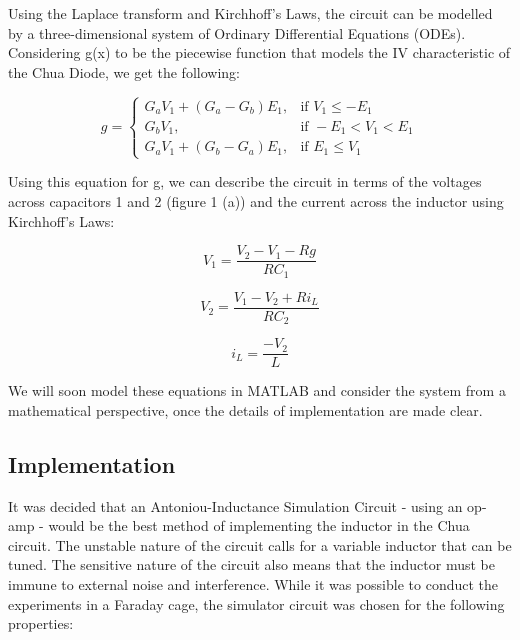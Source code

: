 \documentclass[jou,apacite]{apa6}
\begin{document}
Using the Laplace transform and Kirchhoff's Laws, the circuit can be modelled by a three-dimensional system of Ordinary Differential Equations (ODEs). Considering g(x) to be the piecewise function that models the IV characteristic of the Chua Diode, we get the following:

\begin{equation}
 g = 
 \begin{cases}
  G_a V_1 + (G_a - G_b) E_1 , & \text{if } V_1 \leqslant -E_1 \\
  G_b V_1 , & \text{if } -E_1 < V_1 < E_1 \\
  G_a V_1 + (G_b - G_a) E_1 , & \text{if } E_1 \leqslant V_1
 \end{cases}
\end{equation}

Using this equation for g, we can describe the circuit in terms of the voltages across capacitors 1 and 2 (figure 1 (a)) and the current across the inductor using Kirchhoff's Laws:

\begin{equation}
V_1 = \frac{V_2 - V_1 - Rg}{RC_1} 
\end{equation}

\begin{equation}
V_2 = \frac{V_1 - V_2 + Ri_L}{RC_2}
\end{equation}

\begin{equation}
i_L = \frac{-V_2}{L}
\end{equation}

We will soon model these equations in MATLAB and consider the system from a mathematical perspective, once the details of implementation are made clear.

\subsection{Implementation}

It was decided that an Antoniou-Inductance Simulation Circuit - using an op-amp - would be the best method of implementing the inductor in the Chua circuit. The unstable nature of the circuit calls for a variable inductor that can be tuned. The sensitive nature of the circuit also means that the inductor must be immune to external noise and interference. While it was possible to conduct the experiments in a Faraday cage, the simulator circuit was chosen for the following properties:
\end{document}
